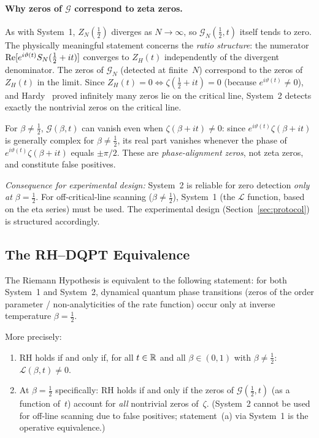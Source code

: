 \paragraph{Why zeros of $\mathcal{G}$ correspond to zeta zeros.}
As with System~1, $Z_N(\tfrac{1}{2})$ diverges as $N \to \infty$, so
$\mathcal{G}_N(\tfrac{1}{2},t)$ itself tends to zero. The physically meaningful
statement concerns the \emph{ratio structure}: the numerator
$\operatorname{Re}[e^{i\vartheta(t)}S_N(\tfrac{1}{2}+it)]$ converges to $Z_H(t)$ independently of
the divergent denominator. The zeros of $\mathcal{G}_N$ (detected at finite~$N$)
correspond to the zeros of $Z_H(t)$ in the limit. Since
$Z_H(t) = 0 \iff \zeta(\tfrac{1}{2}+it) = 0$ (because $e^{i\vartheta(t)} \ne 0$),
and Hardy~\cite{hardy1914} proved infinitely many zeros lie on the critical line,
System~2 detects exactly the nontrivial zeros on the critical line.

\begin{remark}\label{rem:false-pos}
For $\beta \ne \tfrac{1}{2}$, $\mathcal{G}(\beta,t)$ can vanish even when
$\zeta(\beta+it) \ne 0$: since $e^{i\vartheta(t)}\zeta(\beta+it)$ is generally complex
for $\beta \ne \tfrac{1}{2}$, its real part vanishes whenever the phase of
$e^{i\vartheta(t)}\zeta(\beta+it)$ equals $\pm\pi/2$. These are \emph{phase-alignment
zeros}, not zeta zeros, and constitute false positives.

\emph{Consequence for experimental design:} System~2 is reliable for zero detection
\emph{only at $\beta = \tfrac{1}{2}$}. For off-critical-line scanning
($\beta \ne \tfrac{1}{2}$), System~1 (the $\mathcal{L}$ function, based on the eta
series) must be used. The experimental design (Section~\ref{sec:protocol}) is
structured accordingly.
\end{remark}


\subsection{The RH--DQPT Equivalence}
\label{sec:equivalence}

\begin{theorem}\label{thm:rh-dqpt}
The Riemann Hypothesis is equivalent to the following statement: for both System~1 and
System~2, dynamical quantum phase transitions (zeros of the order parameter /
non-analyticities of the rate function) occur only at inverse temperature
$\beta = \tfrac{1}{2}$.

More precisely:
\begin{enumerate}
  \item[(a)] RH holds if and only if, for all $t \in \mathbb{R}$ and all $\beta \in (0,1)$ with
    $\beta \ne \tfrac{1}{2}$: $\mathcal{L}(\beta,t) \ne 0$.
  \item[(b)] At $\beta = \tfrac{1}{2}$ specifically: RH holds if and only if the zeros of
    $\mathcal{G}(\tfrac{1}{2},t)$ (as a function of~$t$) account for \emph{all}
    nontrivial zeros of~$\zeta$. (System~2 cannot be used for off-line scanning due to
    false positives; statement~(a) via System~1 is the operative equivalence.)
\end{enumerate}
\end{theorem}

